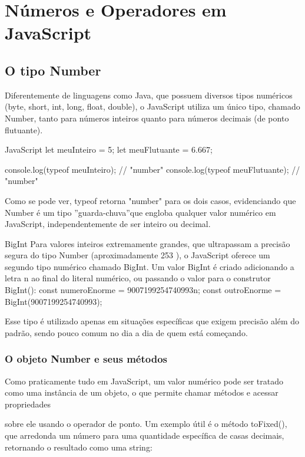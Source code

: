 \chapter{Números e Operadores em JavaScript}

\section{O tipo Number}

Diferentemente de linguagens como Java, que possuem diversos tipos numéricos (byte, short, int, long, float, double), o JavaScript utiliza um único tipo, chamado Number, tanto para números inteiros quanto para números decimais (de ponto flutuante).

\begin{codebox}{JavaScript}
let meuInteiro = 5;
let meuFlutuante = 6.667;

console.log(typeof meuInteiro);   // "number"
console.log(typeof meuFlutuante); // "number"
\end{codebox}

Como se pode ver, typeof retorna "number" para os dois casos, evidenciando que Number é um tipo ”guarda-chuva”que engloba qualquer valor numérico em JavaScript, independentemente de ser inteiro ou decimal.

\begin{infobox}{BigInt}
Para valores inteiros extremamente grandes, que ultrapassam a precisão segura do tipo Number (aproximadamente 253 ), o JavaScript oferece um segundo tipo numérico chamado BigInt. Um valor BigInt é criado adicionando a letra n ao final do literal numérico, ou passando o valor para o construtor BigInt(): const numeroEnorme = 9007199254740993n; const outroEnorme = BigInt(9007199254740993);
\end{infobox}

Esse tipo é utilizado apenas em situações específicas que exigem precisão além do padrão, sendo pouco comum no dia a dia de quem está começando.

\subsection{O objeto Number e seus métodos}

Como praticamente tudo em JavaScript, um valor numérico pode ser tratado como uma instância de um objeto, o que permite chamar métodos e acessar propriedades

sobre ele usando o operador de ponto. Um exemplo útil é o método toFixed(), que arredonda um número para uma quantidade específica de casas decimais, retornando o resultado como uma string:

